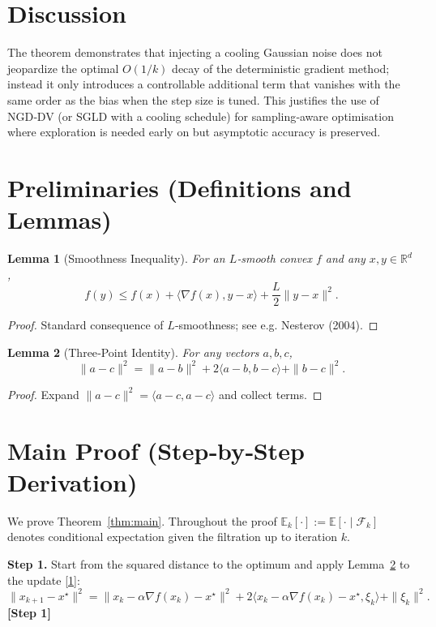 \documentclass{article}
\newtheorem{lemma}{Lemma}
\begin{document}
\section*{Discussion}
The theorem demonstrates that injecting a cooling Gaussian noise does not jeopardize the optimal $O(1/k)$ decay of the deterministic gradient method; instead it only introduces a controllable additional term that vanishes with the same order as the bias when the step size is tuned. This justifies the use of NGD‑DV (or SGLD with a cooling schedule) for sampling‑aware optimisation where exploration is needed early on but asymptotic accuracy is preserved.

\newpage
\section*{Preliminaries (Definitions and Lemmas)}
\begin{lemma}[Smoothness Inequality]\label{lem:smooth}
For an $L$‑smooth convex $f$ and any $x,y\in\mathbb{R}^d$,
\[
f(y)\le f(x)+\langle\nabla f(x),y-x\rangle+\frac{L}{2}\|y-x\|^2.
\]
\end{lemma}
\begin{proof}
Standard consequence of $L$‑smoothness; see e.g. Nesterov (2004). \qedhere
\end{proof}

\begin{lemma}[Three‑Point Identity]\label{lem:three}
For any vectors $a,b,c$,
\[
\|a-c\|^2 = \|a-b\|^2 + 2\langle a-b, b-c\rangle + \|b-c\|^2 .
\]
\end{lemma}
\begin{proof}
Expand $\|a-c\|^2 = \langle a-c, a-c\rangle$ and collect terms. \qedhere
\end{proof}

\section*{Main Proof (Step‑by‑Step Derivation)}
We prove Theorem~\ref{thm:main}. Throughout the proof $\mathbb{E}_k[\cdot]:=\mathbb{E}[\cdot\mid\mathcal{F}_k]$ denotes conditional expectation given the filtration up to iteration $k$.

\noindent\textbf{Step 1.}  Start from the squared distance to the optimum and apply Lemma~\ref{lem:three} to the update \eqref{1}:
\[
\|x_{k+1}-x^\star\|^2
 = \|x_k-\alpha\nabla f(x_k)-x^\star\|^2 + 2\langle x_k-\alpha\nabla f(x_k)-x^\star,\xi_k\rangle + \|\xi_k\|^2 .
\tag{4}
\]
\textbf{[Step 1]}
\end{document}
